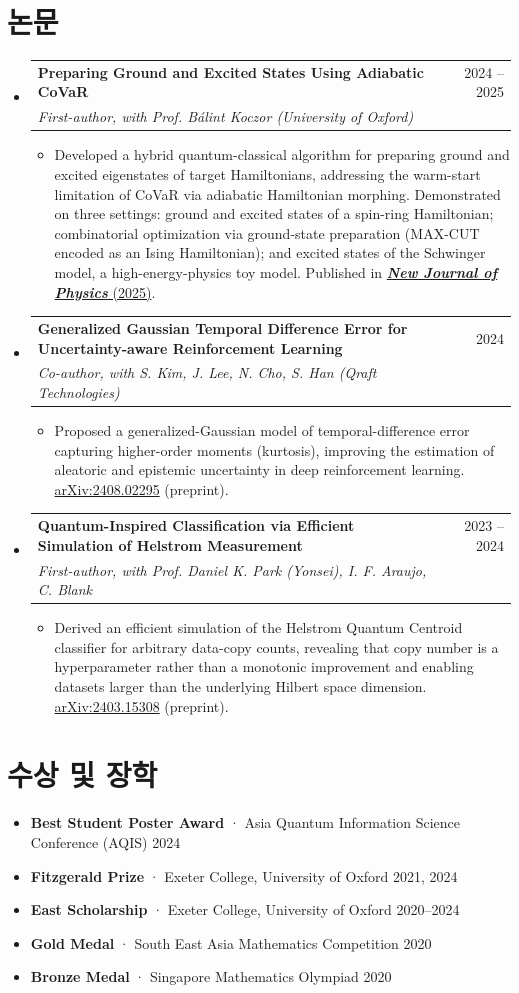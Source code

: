 \documentclass[letterpaper,11pt]{article}
\makeatletter
\newcommand{\resumeItem}[1]{
  \item{
    {#1 \vspace{-4pt}}
  }
}
\newcommand{\resumeSubheading}[4]{
  \needspace{7\baselineskip}\vspace{-2pt}\item
    \begin{tabular*}{0.97\textwidth}[t]{@{}p{0.68\textwidth}@{\extracolsep{\fill}}r@{}}
      \textbf{#1} & #2 \\
      \textit{\small #3} & \textit{\small #4} \\
    \end{tabular*}\vspace{-10pt}
}
\newcommand{\resumeSubHeadingListStart}{\begin{itemize}[leftmargin=0.15in, label={}]}
\newcommand{\resumeSubHeadingListEnd}{\end{itemize}}
\newcommand{\resumeItemListStart}{\begin{itemize}}
\newcommand{\resumeItemListEnd}{\end{itemize}\vspace{-2pt}}
\makeatother
\begin{document}
\section{논문}
\resumeSubHeadingListStart

    \resumeSubheading
      {Preparing Ground and Excited States Using Adiabatic CoVaR}{2024 -- 2025}
      {First-author, with Prof. B\'alint Koczor (University of Oxford)}{}
      \resumeItemListStart
        \resumeItem{Developed a hybrid quantum-classical algorithm for preparing ground and excited eigenstates of target Hamiltonians, addressing the warm-start limitation of CoVaR via adiabatic Hamiltonian morphing. Demonstrated on three settings: ground and excited states of a spin-ring Hamiltonian; combinatorial optimization via ground-state preparation (MAX-CUT encoded as an Ising Hamiltonian); and excited states of the Schwinger model, a high-energy-physics toy model. Published in \href{https://iopscience.iop.org/article/10.1088/1367-2630/adb173}{\textbf{\textit{New Journal of Physics}} (2025)}.}
      \resumeItemListEnd

  \resumeSubheading
    {Generalized Gaussian Temporal Difference Error for Uncertainty-aware Reinforcement Learning}{2024}
    {Co-author, with S. Kim, J. Lee, N. Cho, S. Han (Qraft Technologies)}{}
    \resumeItemListStart
      \resumeItem{Proposed a generalized-Gaussian model of temporal-difference error capturing higher-order moments (kurtosis), improving the estimation of aleatoric and epistemic uncertainty in deep reinforcement learning. \href{https://arxiv.org/abs/2408.02295}{arXiv:2408.02295} (preprint).}
    \resumeItemListEnd

  \resumeSubheading
    {Quantum-Inspired Classification via Efficient Simulation of Helstrom Measurement}{2023 -- 2024}
    {First-author, with Prof. Daniel K. Park (Yonsei), I. F. Araujo, C. Blank}{}
    \resumeItemListStart
      \resumeItem{Derived an efficient simulation of the Helstrom Quantum Centroid classifier for arbitrary data-copy counts, revealing that copy number is a hyperparameter rather than a monotonic improvement and enabling datasets larger than the underlying Hilbert space dimension. \href{https://arxiv.org/abs/2403.15308}{arXiv:2403.15308} (preprint).}
    \resumeItemListEnd

\resumeSubHeadingListEnd

\section{수상 및 장학}
\resumeSubHeadingListStart
  \resumeItem{\textbf{Best Student Poster Award} · Asia Quantum Information Science Conference (AQIS) \hfill 2024}
  \resumeItem{\textbf{Fitzgerald Prize} · Exeter College, University of Oxford \hfill 2021, 2024}
  \resumeItem{\textbf{East Scholarship} · Exeter College, University of Oxford \hfill 2020--2024}
  \resumeItem{\textbf{Gold Medal} · South East Asia Mathematics Competition \hfill 2020}
  \resumeItem{\textbf{Bronze Medal} · Singapore Mathematics Olympiad \hfill 2020}
\resumeSubHeadingListEnd
\end{document}
